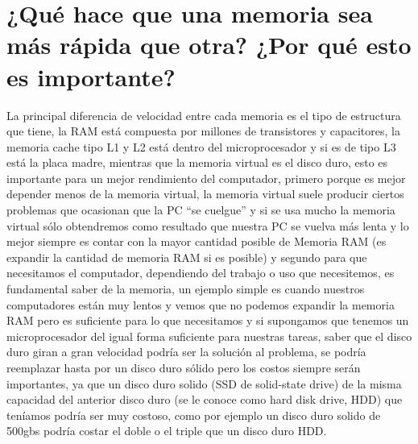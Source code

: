 \documentclass{article}
\begin{document}
\section{¿Qué hace que una memoria sea más rápida que otra? ¿Por qué esto es importante?}
La principal diferencia de velocidad entre cada memoria es el tipo de estructura que tiene, la RAM está compuesta por millones de transistores y capacitores,\cite{Augusto} la memoria cache tipo L1 y L2 está dentro del microprocesador y si es de tipo L3 está la placa madre, mientras que la memoria virtual es el disco duro, esto es importante para un mejor rendimiento del computador, primero porque es mejor depender menos de la memoria virtual, la memoria virtual suele producir ciertos problemas que ocasionan que la PC “se cuelgue” y si se usa mucho la memoria virtual sólo obtendremos como resultado que nuestra PC se vuelva más lenta \cite{Venturini} y lo mejor siempre es contar con la mayor cantidad posible de Memoria RAM (es expandir la cantidad de memoria RAM si es posible) y segundo para que necesitamos el computador, dependiendo del trabajo o uso que necesitemos, es fundamental saber de la memoria, un ejemplo simple es cuando nuestros computadores están muy lentos y vemos que no podemos expandir la memoria RAM pero es suficiente para lo que necesitamos y si supongamos que tenemos un microprocesador del igual forma suficiente para nuestras tareas, saber que el disco duro giran a gran velocidad podría ser la solución al problema, se podría reemplazar hasta por un disco duro sólido pero los costos siempre serán importantes, ya que un disco duro solido (SSD de solid-state drive) de la misma capacidad del anterior disco duro (se le conoce como hard disk drive, HDD) que teníamos podría ser muy costoso, como por ejemplo un disco duro solido de 500gbs podría costar el doble o el triple que un disco duro HDD.





\end{document}
